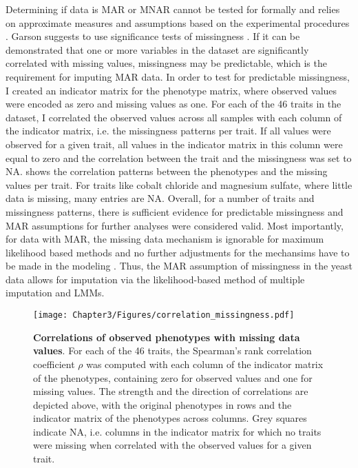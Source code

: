 Determining if data is MAR or MNAR cannot be tested for formally and relies on approximate measures and assumptions based on the experimental procedures \citep{SchaferGraham2002,Garson2015,Templ2012}. Garson suggests to use significance tests of missingness \citeyear{Garson2015}. If it can be demonstrated that one or more variables in the dataset are significantly correlated with missing values, missingness may be predictable, which is the requirement for imputing MAR data. In order to test for predictable missingness, I created an indicator matrix for the phenotype matrix, where observed values were encoded as zero and missing values as one. For each of the \num{46} traits in the dataset, I correlated the observed values across all samples with each column of the indicator matrix, i.e. the missingness patterns per trait. If all values were observed for a given trait, all values in the indicator matrix in this column were equal to zero and the correlation between the trait and the missingness was set to NA.  shows the correlation patterns between the phenotypes and the missing values per trait. For traits like cobalt chloride and magnesium sulfate, where little data is missing, many entries are NA. Overall, for a number of traits and missingness patterns, there is sufficient evidence for predictable missingness and MAR assumptions for further analyses were considered valid. Most importantly, for data with MAR, the missing data mechanism is ignorable for maximum likelihood based methods and no further adjustments for the mechansims have to be made in the modeling \citep{Rubin1976,Little1988}. Thus, the MAR assumption of missingness in the yeast data allows for imputation via the likelihood-based method of multiple imputation and LMMs.


\begin{figure}[hbtp]
	\centering
	\texttt{[image: Chapter3/Figures/correlation\_missingness.pdf]}
	\caption[\textbf{Correlations of observed phenotypes with missing data values.} Generated via R function \textit{corrplot::corrplot}]{\textbf{Correlations of observed phenotypes with missing data values}. For each of the \num{46} traits, the Spearman's rank correlation coefficient \(\rho\) was computed with each column of the indicator matrix of the phenotypes, containing zero for observed values and one for missing values. The strength and the direction of correlations are depicted above, with the original phenotypes in rows and the indicator matrix of the phenotypes across columns.  Grey squares indicate NA, i.e. columns in the indicator matrix for which no traits were missing when correlated with the observed values for a given trait.}
 	\label{fig:missingnesscorrelations}
\end{figure}

